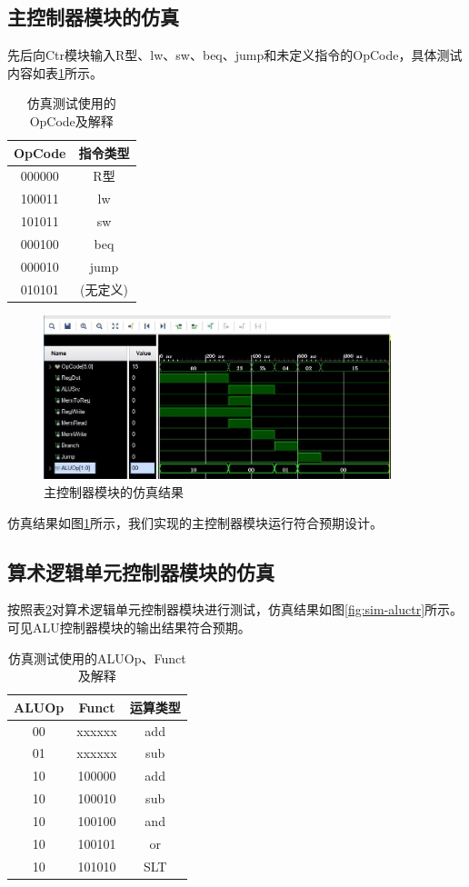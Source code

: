 \documentclass[UTF8]{ctexart}
\begin{document}
\subsection{主控制器模块的仿真}
先后向Ctr模块输入R型、lw、sw、beq、jump和未定义指令的OpCode，具体测试内容如表\ref{tab:sim-ctr}所示。
\begin{table}[htbp]
    \centering
    \begin{tabular}{|c|c|}
    \hline
    OpCode & 指令类型 \\
    \hline
    000000 & R型 \\
    100011 & lw \\
    101011 & sw \\
    000100 & beq \\
    000010 & jump \\
    010101 & (无定义) \\
    \hline
    \end{tabular}
    \caption{仿真测试使用的OpCode及解释}
    \label{tab:sim-ctr}
    \end{table}

\begin{figure}[htbp]
    \centering
    \includegraphics[width=0.9\textwidth]{fig-sim-ctr.jpg}
    \caption{主控制器模块的仿真结果}
    \label{fig:sim-ctr}
\end{figure}
仿真结果如图\ref{fig:sim-ctr}所示，我们实现的主控制器模块运行符合预期设计。

\subsection{算术逻辑单元控制器模块的仿真}
按照表\ref{tab:sim-aluctr}对算术逻辑单元控制器模块进行测试，仿真结果如图\ref{fig:sim-aluctr}所示。可见ALU控制器模块的输出结果符合预期。
\begin{table}[htbp]
    \centering
    \begin{tabular}{|c|c|c|}
    \hline
    ALUOp & Funct & 运算类型 \\
    \hline
    00 & xxxxxx & add \\
    01 & xxxxxx & sub \\
    10 & 100000 & add \\
    10 & 100010 & sub \\
    10 & 100100 & and \\
    10 & 100101 & or \\
    10 & 101010 & SLT \\
    \hline
    \end{tabular}
    \caption{仿真测试使用的ALUOp、Funct及解释}
    \label{tab:sim-aluctr}
    \end{table}
\end{document}
